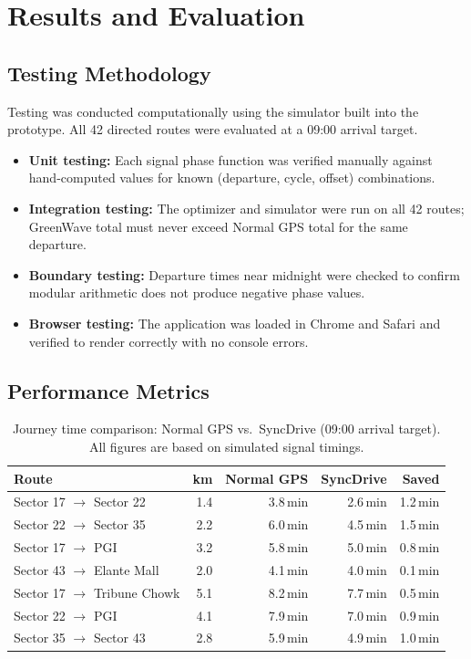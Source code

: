 \documentclass[12pt,a4paper]{report}
\begin{document}
\chapter{Results and Evaluation}

\section{Testing Methodology}

Testing was conducted computationally using the simulator built into the
prototype. All 42 directed routes were evaluated at a 09:00 arrival target.

\begin{itemize}
  \item \textbf{Unit testing:} Each signal phase function was verified
        manually against hand-computed values for known (departure, cycle,
        offset) combinations.
  \item \textbf{Integration testing:} The optimizer and simulator were run on
        all 42 routes; GreenWave total must never exceed Normal GPS total for
        the same departure.
  \item \textbf{Boundary testing:} Departure times near midnight were checked
        to confirm modular arithmetic does not produce negative phase values.
  \item \textbf{Browser testing:} The application was loaded in Chrome and
        Safari and verified to render correctly with no console errors.
\end{itemize}

\section{Performance Metrics}

\begin{table}[h]
\centering
\begin{tabular}{lrrrr}
\toprule
\textbf{Route} & \textbf{km} & \textbf{Normal GPS} & \textbf{SyncDrive} & \textbf{Saved} \\
\midrule
Sector 17 $\to$ Sector 22    & 1.4 & 3.8\,min & 2.6\,min & 1.2\,min \\
Sector 22 $\to$ Sector 35    & 2.2 & 6.0\,min & 4.5\,min & 1.5\,min \\
Sector 17 $\to$ PGI          & 3.2 & 5.8\,min & 5.0\,min & 0.8\,min \\
Sector 43 $\to$ Elante Mall  & 2.0 & 4.1\,min & 4.0\,min & 0.1\,min \\
Sector 17 $\to$ Tribune Chowk& 5.1 & 8.2\,min & 7.7\,min & 0.5\,min \\
Sector 22 $\to$ PGI          & 4.1 & 7.9\,min & 7.0\,min & 0.9\,min \\
Sector 35 $\to$ Sector 43    & 2.8 & 5.9\,min & 4.9\,min & 1.0\,min \\
\bottomrule
\end{tabular}
\caption{Journey time comparison: Normal GPS vs.\ SyncDrive (09:00 arrival
target). All figures are based on simulated signal timings.}
\end{table}
\end{document}
